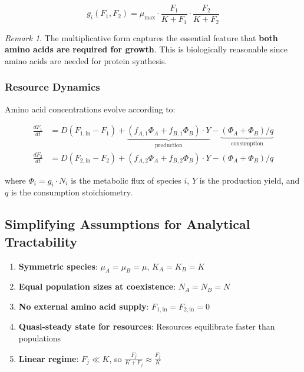 \documentclass[11pt]{article}
\theoremstyle{definition}
\theoremstyle{remark}
\newtheorem{remark}{Remark}
\newcommand{\ddt}[1]{\frac{d#1}{dt}}
\begin{document}
\begin{equation}
g_i(F_1, F_2) = \mu_{\max} \cdot \frac{F_1}{K + F_1} \cdot \frac{F_2}{K + F_2} \label{eq:growth}
\end{equation}

\begin{remark}
The multiplicative form captures the essential feature that \textbf{both amino acids are required for growth}. This is biologically reasonable since amino acids are needed for protein synthesis.
\end{remark}

\subsubsection{Resource Dynamics}

Amino acid concentrations evolve according to:

\begin{align}
\ddt{F_1} &= D(F_{1,\text{in}} - F_1) + \underbrace{(f_{A,1} \Phi_A + f_{B,1} \Phi_B) \cdot Y}_{\text{production}} - \underbrace{(\Phi_A + \Phi_B)/q}_{\text{consumption}} \label{eq:F1}\\
\ddt{F_2} &= D(F_{2,\text{in}} - F_2) + (f_{A,2} \Phi_A + f_{B,2} \Phi_B) \cdot Y - (\Phi_A + \Phi_B)/q \label{eq:F2}
\end{align}

where $\Phi_i = g_i \cdot N_i$ is the metabolic flux of species $i$, $Y$ is the production yield, and $q$ is the consumption stoichiometry.

\subsection{Simplifying Assumptions for Analytical Tractability}

\begin{enumerate}
    \item \textbf{Symmetric species}: $\mu_A = \mu_B = \mu$, $K_A = K_B = K$
    \item \textbf{Equal population sizes at coexistence}: $N_A = N_B = N$
    \item \textbf{No external amino acid supply}: $F_{1,\text{in}} = F_{2,\text{in}} = 0$
    \item \textbf{Quasi-steady state for resources}: Resources equilibrate faster than populations
    \item \textbf{Linear regime}: $F_j \ll K$, so $\frac{F_j}{K + F_j} \approx \frac{F_j}{K}$
\end{enumerate}
\end{document}
